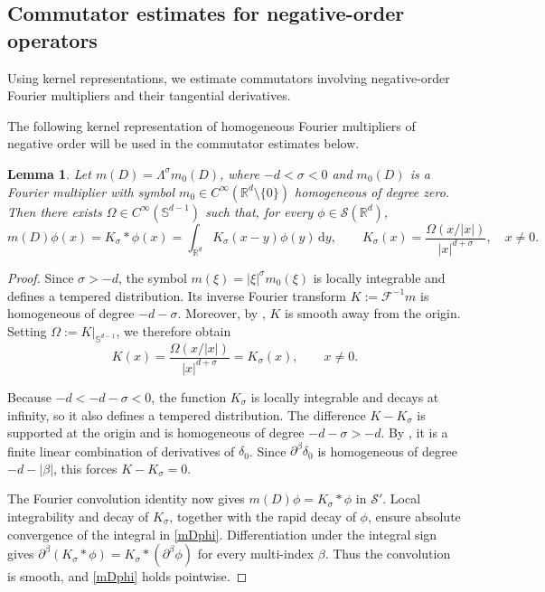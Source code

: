 \documentclass[reqno,11pt,a4paper]{amsart}
\newtheorem{lemma}[theorem]{Lemma}
\newcommand{\dd}{\mathrm{d}}
\begin{document}
\subsection{Commutator estimates for negative-order operators}
\label{subsec:tangential-tools}

Using kernel representations, we estimate commutators
involving negative-order Fourier multipliers
and their tangential derivatives.

The following kernel representation of homogeneous
Fourier multipliers of negative order
will be used in the commutator estimates below.
\begin{lemma}\label{lem:mDphi}
Let $m(D)=\Lambda^\sigma m_0(D)$, where $-d<\sigma<0$
and $m_0(D)$ is a Fourier multiplier with symbol
$m_0\in C^\infty(\mathbb R^d\setminus\{0\})$
homogeneous of degree zero.
Then there exists $\Omega\in C^\infty(\mathbb S^{d-1})$
such that, for every $\phi\in\mathcal S(\mathbb R^d)$,
\begin{equation}\label{mDphi}
  m(D)\phi(x)
  =K_\sigma*\phi(x)
  =\int_{\mathbb R^d}K_\sigma(x-y)\phi(y)\,\dd y,
  \qquad
  K_\sigma(x)
  =\frac{\Omega(x/|x|)}{|x|^{d+\sigma}},
  \quad x\neq0.
\end{equation}
\end{lemma}

\begin{proof}
Since $\sigma>-d$, the symbol
$m(\xi)=|\xi|^\sigma m_0(\xi)$ is locally integrable
and defines a tempered distribution.
Its inverse Fourier transform $K:=\mathcal F^{-1}m$
is homogeneous of degree $-d-\sigma$.
Moreover, by \cite[Proposition~2.4.8]{Gra14},
$K$ is smooth away from the origin.
Setting $\Omega:=K|_{\mathbb S^{d-1}}$, we therefore obtain
\[
  K(x)=\frac{\Omega(x/|x|)}{|x|^{d+\sigma}}
  =K_\sigma(x),
  \qquad x\neq0.
\]

Because $-d<-d-\sigma<0$, the function $K_\sigma$
is locally integrable and decays at infinity,
so it also defines a tempered distribution.
The difference $K-K_\sigma$ is supported at the origin
and is homogeneous of degree $-d-\sigma>-d$.
By \cite[Proposition~2.4.1]{Gra14}, it is a finite
linear combination of derivatives of $\delta_0$.
Since $\partial^\beta\delta_0$ is homogeneous
of degree $-d-|\beta|$, this forces $K-K_\sigma=0$.

The Fourier convolution identity now gives
$m(D)\phi=K_\sigma*\phi$ in $\mathcal S'$.
Local integrability and decay of $K_\sigma$,
together with the rapid decay of $\phi$,
ensure absolute convergence of the integral
in \eqref{mDphi}.
Differentiation under the integral sign gives
$\partial^\beta(K_\sigma*\phi) =K_\sigma*(\partial^\beta\phi)$
for every multi-index $\beta$.
Thus the convolution is smooth, and
\eqref{mDphi} holds pointwise.
\end{proof}
\end{document}
